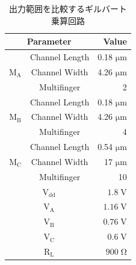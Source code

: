         \begin{table}[!b]
                \centering
                \caption{出力範囲を比較するギルバート乗算回路}
                \label{table:3_prev_com_param}
                \begin{tabular}{c|c|r}
                    \hline
                    \multicolumn{2}{c|}{Parameter}   & Value     \\
                    \hline\hline
                    &   Channel Length   &   0.18 $\mathrm{\mu m}$   \\
                    \cline{2-3}
                    $\mathrm{M_{A}}$   &   Channel Width   &   4.26 $\mathrm{\mu m}$   \\
                    \cline{2-3}
                        &   Multifinger   & 2    \\
                    \hline
                    &   Channel Length   &   0.18 $\mathrm{\mu m}$   \\
                    \cline{2-3}
                    $\mathrm{M_{B}}$   &   Channel Width   &   4.26 $\mathrm{\mu m}$   \\
                    \cline{2-3}
                        &   Multifinger   & 4    \\
                    \hline
                    &   Channel Length   &   0.54 $\mathrm{\mu m}$   \\
                    \cline{2-3}
                    $\mathrm{M_{C}}$   &   Channel Width   &   17 $\mathrm{\mu m}$   \\
                    \cline{2-3}
                        &   Multifinger   & 10    \\
                    \hline
                    \multicolumn{2}{c|}{$\mathrm{V_{dd}}$} &   $1.8\;\mathrm{V}$   \\
                    \hline
                    \multicolumn{2}{c|}{$\mathrm{V_{A}}$} &   $1.16\;\mathrm{V}$   \\
                    \hline
                    \multicolumn{2}{c|}{$\mathrm{V_{B}}$} &   $0.76\;\mathrm{V}$   \\
                    \hline
                    \multicolumn{2}{c|}{$\mathrm{V_{C}}$} &   $0.6\;\mathrm{V}$   \\
                    \hline
                    \multicolumn{2}{c|}{$\mathrm{R_{L}}$} &   $900\;\mathrm{\Omega}$   \\
                    \hline
                \end{tabular}
        \end{table}
